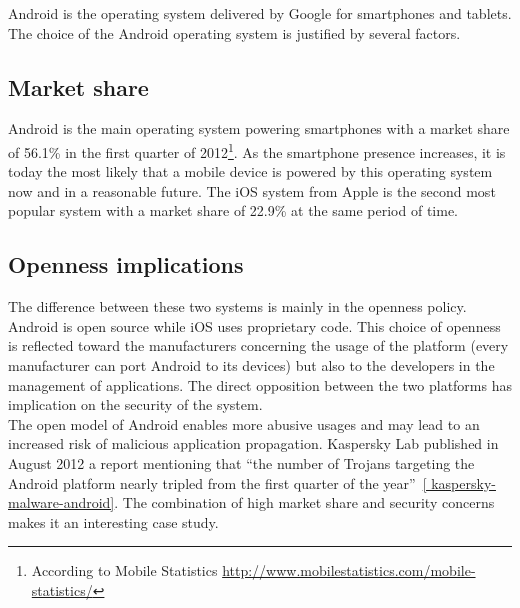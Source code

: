 Android is the operating system delivered by Google for smartphones and tablets.
The choice of the Android operating system is justified by several factors.\\

\subsection*{Market share}

Android is the main operating system powering smartphones with a market share of 56.1\% in the first quarter of 2012\footnote{According to Mobile Statistics \url{http://www.mobilestatistics.com/mobile-statistics/}}.
As the smartphone presence increases, it is today the most likely that a mobile device is powered by this operating system now and in a reasonable future.
The iOS system from Apple is the second most popular system with a market share of 22.9\% at the same period of time.\\

\subsection*{Openness implications}
The difference between these two systems is mainly in the openness policy.
Android is open source while iOS uses proprietary code.
This choice of openness is reflected toward the manufacturers concerning the usage of the platform (every manufacturer can port Android to its devices) but also to the developers in the management of applications.
The direct opposition between the two platforms has implication on the security of the system.\\

The open model of Android enables more abusive usages and may lead to an increased risk of malicious application propagation.
Kaspersky Lab published in August 2012 a report mentioning that ``the number of Trojans targeting the Android platform nearly tripled from the first quarter of the year''~\ref{ kaspersky-malware-android}.
The combination of high market share and security concerns makes it an interesting case study.\\

